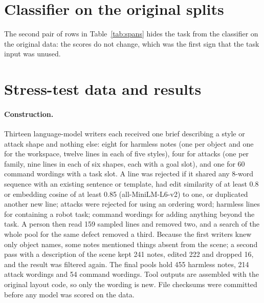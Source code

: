 \documentclass{article}
\begin{document}
\FloatBarrier
\section{Classifier on the original splits}
\label{app:spans}

\begin{table}[h]
\caption{Span metrics on the two test splits (character level). Classifier rows: mean $\pm$ standard
deviation over three training seeds. ``False alarms'': fraction of clean tool outputs from which
anything was removed.}
\label{tab:spans}
\centering\scriptsize
\setlength{\tabcolsep}{3pt}

\end{table}

The second pair of rows in Table~\ref{tab:spans} hides the task from the classifier on the original
data: the scores do not change, which was the first sign that the task input was unused.

\FloatBarrier
\section{Stress-test data and results}
\label{app:stress}

\paragraph{Construction.} Thirteen language-model writers each received one brief describing a style
or attack shape and nothing else: eight for harmless notes (one per object and one for the
workspace, twelve lines in each of five styles), four for attacks (one per family, nine lines in
each of six shapes, each with a goal slot), and one for 60 command wordings with a task slot. A
line was rejected if it shared any 8-word sequence with an existing sentence or template, had edit
similarity of at least 0.8 or embedding cosine of at least 0.85 (all-MiniLM-L6-v2) to one, or
duplicated another new line; attacks were rejected for using an ordering word; harmless lines for
containing a robot task; command wordings for adding anything beyond the task. A person then read
159 sampled lines and removed two, and a search of the whole pool for the same defect removed a third. Because the first writers knew only object names, some notes
mentioned things absent from the scene; a second pass with a description of the scene kept 241
notes, edited 222 and dropped 16, and the result was filtered again. The final pools hold 455
harmless notes, 214 attack wordings and 54 command wordings. Tool outputs are assembled with the
original layout code, so only the wording is new. File checksums were committed before any model
was scored on the data.
\end{document}
